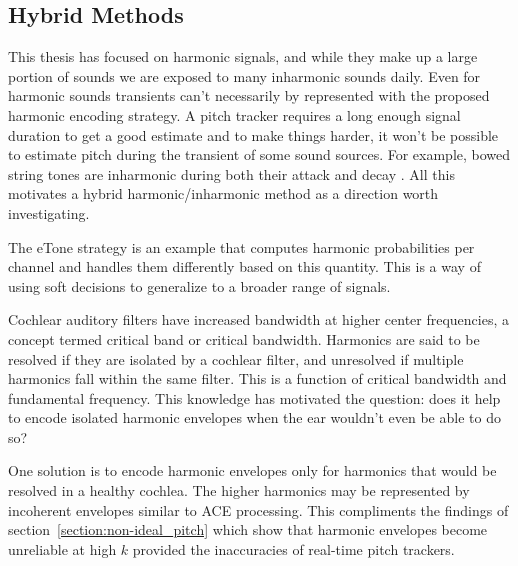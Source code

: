 \documentclass [11pt, proquest,oneside] {ganter_thesis}[2015/03/03]
\begin{document}
\subsection{Hybrid Methods}


This thesis has focused on harmonic signals, and while they make up a large portion of sounds we are exposed to many inharmonic sounds daily.  Even for harmonic sounds transients can't necessarily by represented with the proposed harmonic encoding strategy.  A pitch tracker requires a long enough signal duration to get a good estimate and to make things harder, it won't be possible to estimate pitch during the transient of some sound sources. For example, bowed string tones are inharmonic during both their attack and decay \cite{beauchamp1974time}.  All this motivates a hybrid harmonic/inharmonic method as a direction worth investigating.

The eTone strategy \cite{vandali2011development} is an example that computes harmonic probabilities per channel and handles them differently based on this quantity.  This is a way of using soft decisions to generalize to a broader range of signals.

Cochlear auditory filters have increased bandwidth at higher center frequencies, a concept termed critical band or critical bandwidth.  Harmonics are said to be resolved if they are isolated by a cochlear filter, and unresolved if multiple harmonics fall within the same filter.  This is a function of critical bandwidth and fundamental frequency.  This knowledge has motivated the question: does it help to encode isolated harmonic envelopes when the ear wouldn't even be able to do so?

One solution is to encode harmonic envelopes only for harmonics that would be resolved in a healthy cochlea.  The higher harmonics may be represented by incoherent envelopes similar to ACE processing.  This compliments the findings of section~\ref{section:non-ideal_pitch} which show that harmonic envelopes become unreliable at high $k$ provided the inaccuracies of real-time pitch trackers.


\end{document}
